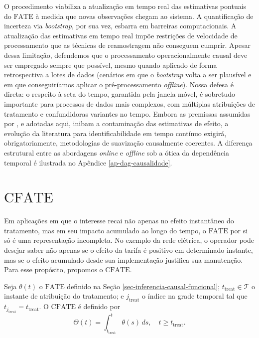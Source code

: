O procedimento viabiliza a atualização em tempo real das estimativas pontuais do \(\mathrm{FATE}\) à medida que novas observações chegam ao sistema.
A quantificação de incerteza via \emph{bootstrap}, por sua vez, esbarra em barreiras computacionais.
A atualização das estimativas em tempo real impõe restrições de velocidade de processamento que as técnicas de reamostragem não conseguem cumprir.
Apesar dessa limitação, defendemos que o processamento operacionalmente causal deve ser empregado sempre que possível, mesmo quando aplicado de forma retrospectiva a lotes de dados (cenários em que o \emph{bootstrap} volta a ser plausível e em que conseguiríamos aplicar o pré-processamento \emph{offline}).
Nossa defesa é direta: o respeito à seta do tempo, garantida pela janela móvel, é sobretudo importante para processos de dados mais complexos, com múltiplas atribuições de tratamento e confundidoras variantes no tempo.
Embora as premissas assumidas por , e adotadas aqui, inibam a contaminação das estimativas de efeito, a evolução da literatura para identificabilidade em tempo contínuo \cite{ying_causality_2024} exigirá, obrigatoriamente, metodologias de suavização causalmente coerentes.
A diferença estrutural entre as abordagens \emph{online} e \emph{offline} sob a ótica da dependência temporal é ilustrada no Apêndice \ref{ap-dag-causalidade}.

\section{\(\mathrm{CFATE}\)}\label{sec-cfate}
Em aplicações em que o interesse recai não apenas no efeito instantâneo do tratamento, mas em seu impacto acumulado ao longo do tempo, o \(\mathrm{FATE}\) por si só é uma representação incompleta. 
No exemplo da rede elétrica, o operador pode desejar saber não apenas se o efeito da tarifa é positivo em determinado instante, mas se o efeito acumulado desde sua implementação justifica sua manutenção. 
Para esse propósito, propomos o \(\mathrm{CFATE}\).

\begin{definition}\label{def:cfate}
    Seja \(\theta(t)\) o \(\mathrm{FATE}\) definido na Seção \ref{sec-inferencia-causal-funcional}; \(t_{\mathrm{treat}} \in \mathcal{T}\) o instante de atribuição do tratamento; e \(j_{\mathrm{treat}}\) o índice na grade temporal tal que \(t_{j_{\mathrm{treat}}} = t_{\mathrm{treat}}\). 
    O \(\mathrm{CFATE}\) é definido por
    \[
        \Theta(t) = \int_{t_{\mathrm{treat}}}^{t} \theta(s)\,ds, \quad t \geq t_{\mathrm{treat}}.
    \]
\end{definition}

